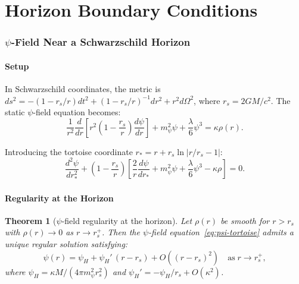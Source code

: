 \documentclass[11pt,a4paper]{article}
\newtheorem{theorem}{Theorem}[section]
\theoremstyle{remark}
\begin{document}
\newpage
\part{Horizon Boundary Conditions}
\label{part:horizon}

\section{$\psi$-Field Near a Schwarzschild Horizon}

\subsection{Setup}

In Schwarzschild coordinates, the metric is
$ds^2 = -(1-r_s/r)dt^2 + (1-r_s/r)^{-1}dr^2 + r^2 d\Omega^2$,
where $r_s = 2GM/c^2$. The static $\psi$-field equation becomes:
\begin{equation}
\frac{1}{r^2}\frac{d}{dr}\left[r^2\left(1-\frac{r_s}{r}\right)\frac{d\psi}{dr}\right]
+ m_\psi^2\psi + \frac{\lambda}{6}\psi^3 = \kappa\rho(r).
\end{equation}

Introducing the tortoise coordinate $r_* = r + r_s\ln|r/r_s - 1|$:
\begin{equation}
\frac{d^2\psi}{dr_*^2} + \left(1-\frac{r_s}{r}\right)\left[\frac{2}{r}\frac{d\psi}{dr_*}
+ m_\psi^2\psi + \frac{\lambda}{6}\psi^3 - \kappa\rho\right] = 0.
\label{eq:psi-tortoise}
\end{equation}

\subsection{Regularity at the Horizon}

\begin{theorem}[$\psi$-field regularity at the horizon]
\label{thm:horizon}
Let $\rho(r)$ be smooth for $r > r_s$ with $\rho(r) \to 0$ as $r \to r_s^+$.
Then the $\psi$-field equation~\eqref{eq:psi-tortoise} admits a unique regular
solution satisfying:
\begin{equation}
\psi(r) = \psi_H + \psi_H'\,(r - r_s) + O((r-r_s)^2)
\quad\text{as}\;r \to r_s^+,
\end{equation}
where $\psi_H = \kappa M/(4\pi m_\psi^2 r_s^2)$ and
$\psi_H' = -\psi_H/r_s + O(\kappa^2)$.
\end{theorem}
\end{document}
